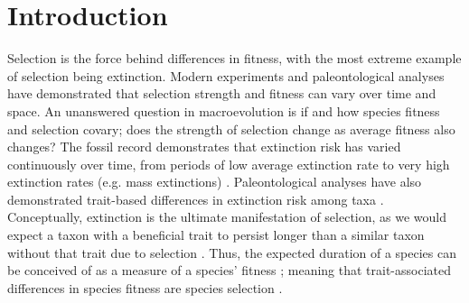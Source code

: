 \documentclass[11pt]{article}
\begin{document}
\newpage{}

\section*{Introduction}

Selection is the force behind differences in fitness, with the most extreme example of selection being extinction. Modern experiments and paleontological analyses have demonstrated that selection strength and fitness can vary over time and space. An unanswered question in macroevolution is if and how species fitness and selection covary; does the strength of selection change as average fitness also changes? The fossil record demonstrates that extinction risk has varied continuously over time, from periods of low average extinction rate to very high extinction rates (e.g. mass extinctions) \citep{Foote2001,Foote2000,Foote2000a}. Paleontological analyses have also demonstrated trait-based differences in extinction risk among taxa \citep{Jablonski2008a}. Conceptually, extinction is the ultimate manifestation of selection, as we would expect a taxon with a beneficial trait to persist longer than a similar taxon without that trait due to selection \citep{Jablonski2008a,Rabosky2010b,Raup1994,Stanley1975}. Thus, the expected duration of a species can be conceived of as a measure of a species' fitness \citep{Cooper1984}; meaning that trait-associated differences in species fitness are species selection \citep{Rabosky2010b}.
\end{document}
